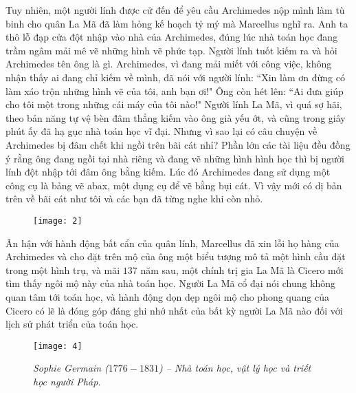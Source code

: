 \begin{multicols}{2}
	\vskip 0.1cm
	Tuy nhiên, một người lính được cử đến để yêu cầu Archimedes nộp mình làm tù binh cho quân La Mã đã làm hỏng kế hoạch tỷ mỷ mà Marcellus nghĩ ra. Anh ta thô lỗ đạp cửa đột nhập vào nhà của Archimedes, đúng lúc  nhà toán học đang trầm ngâm mải mê vẽ những hình vẽ phức tạp. Người lính tuốt kiếm ra và hỏi Archimedes tên ông là gì. Archimedes, vì đang mải miết với công việc, không nhận thấy ai đang chỉ kiếm về mình, đã nói với người lính: ``Xin làm ơn đừng có làm xáo trộn những hình vẽ của tôi, anh bạn ơi!" Ông còn hét lên: ``Ai đưa giúp cho tôi một trong những cái máy của tôi nào!" Người lính La Mã, vì quá sợ hãi, theo bản năng tự vệ bèn đâm thẳng kiếm vào ông già yếu ớt, và cũng trong giây phút ấy đã hạ gục nhà toán học vĩ đại.
	\vskip 0.1cm
	Nhưng vì sao lại có câu chuyện về Archimedes bị đâm chết khi ngồi trên bãi cát nhỉ? Phần lớn các tài liệu đều đồng ý rằng ông đang ngồi tại nhà riêng và đang vẽ những hình hình học thì bị người lính đột nhập tới đâm ông bằng kiếm. Lúc đó Archimedes đang sử dụng một công cụ là bảng vẽ abax, một dụng cụ để vẽ bằng bụi cát. Vì vậy mới có dị bản trên về bãi cát như tôi và các bạn đã từng nghe khi còn nhỏ.
	\begin{figure}[H]
		\vspace*{-5pt}
		\centering
		\captionsetup{labelformat= empty, justification=centering}
		\texttt{[image: 2]}
		\vspace*{-15pt}
	\end{figure}
	Ân hận với hành động bất cẩn của quân lính, Marcellus đã xin lỗi họ hàng của Archimedes và cho đặt trên mộ của ông một biểu tượng mô tả một hình cầu đặt trong một hình trụ, và mãi $137$ năm sau, một chính trị gia La Mã là Cicero mới tìm thấy ngôi mộ này của nhà toán học. Người La Mã cổ đại nói chung không quan tâm tới toán học, và hành động dọn dẹp ngôi mộ cho phong quang của Cicero có lẽ là đóng góp đáng ghi nhớ nhất của bất kỳ người La Mã nào đối với lịch sử phát triển của toán học.
	\begin{figure}[H]
		\vspace*{-5pt}
		\centering
		\captionsetup{labelformat= empty, justification=centering}
		\texttt{[image: 4]}
		\caption{\small\textit{\color{quantoan}Sophie Germain ($1776-1831$) -- Nhà toán học, vật lý học và triết học người Pháp.}}
		\vspace*{-10pt}
	\end{figure}

\end{multicols}
